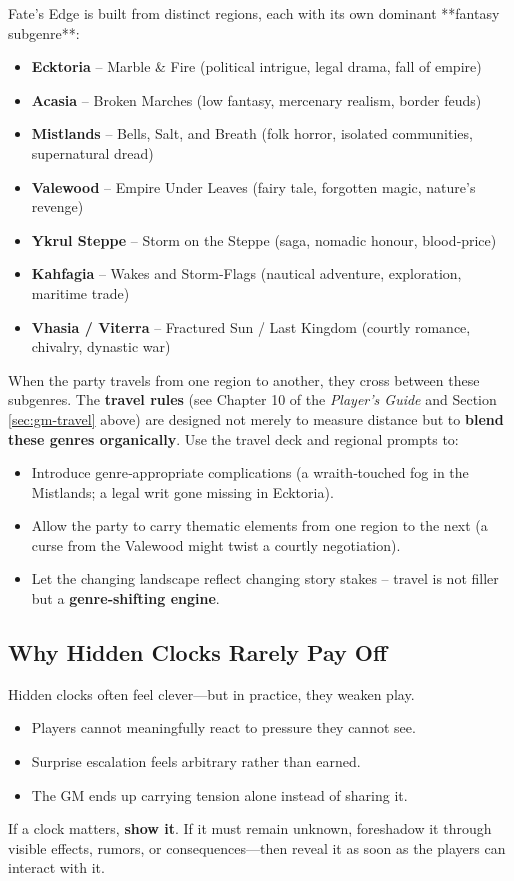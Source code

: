 Fate’s Edge is built from distinct regions, each with its own dominant **fantasy subgenre**:
\begin{itemize}
  \item \textbf{Ecktoria} – Marble \& Fire (political intrigue, legal drama, fall of empire)
  \item \textbf{Acasia} – Broken Marches (low fantasy, mercenary realism, border feuds)
  \item \textbf{Mistlands} – Bells, Salt, and Breath (folk horror, isolated communities, supernatural dread)
  \item \textbf{Valewood} – Empire Under Leaves (fairy tale, forgotten magic, nature’s revenge)
  \item \textbf{Ykrul Steppe} – Storm on the Steppe (saga, nomadic honour, blood‑price)
  \item \textbf{Kahfagia} – Wakes and Storm‑Flags (nautical adventure, exploration, maritime trade)
  \item \textbf{Vhasia / Viterra} – Fractured Sun / Last Kingdom (courtly romance, chivalry, dynastic war)
\end{itemize}

When the party travels from one region to another, they cross between these subgenres. The \textbf{travel rules} (see Chapter 10 of the \textit{Player's Guide} and Section \ref{sec:gm-travel} above) are designed not merely to measure distance but to \textbf{blend these genres organically}. Use the travel deck and regional prompts to:
\begin{itemize}
  \item Introduce genre‑appropriate complications (a wraith‑touched fog in the Mistlands; a legal writ gone missing in Ecktoria).
  \item Allow the party to carry thematic elements from one region to the next (a curse from the Valewood might twist a courtly negotiation).
  \item Let the changing landscape reflect changing story stakes – travel is not filler but a \textbf{genre‑shifting engine}.
\end{itemize}

\subsection{Why Hidden Clocks Rarely Pay Off}
\label{subsec:hidden-clocks}

Hidden clocks often feel clever—but in practice, they weaken play.
\begin{itemize}
  \item Players cannot meaningfully react to pressure they cannot see.
  \item Surprise escalation feels arbitrary rather than earned.
  \item The GM ends up carrying tension alone instead of sharing it.
\end{itemize}
If a clock matters, \textbf{show it}. If it must remain unknown, foreshadow it through visible effects, rumors, or consequences—then reveal it as soon as the players can interact with it.

